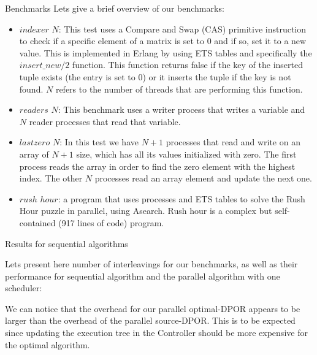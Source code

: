 \begin{frame} {Benchmarks}
Lets give a brief overview of our benchmarks:

\begin{itemize}
    \item $indexer$ $N$: This test uses a Compare and Swap (CAS) primitive instruction to check if a specific element of
    a matrix is set to 0 and if so, set it to a new value. This is implemented in Erlang by using ETS tables and specifically
    the $insert\_new/2$ function. This function returns false if the key of the inserted tuple exists (the entry is set to 0)
    or it inserts the tuple if the key is not found. $N$ refers to the number of threads that are performing this function.
    \item $readers$ $N$: This benchmark uses a writer process that writes a variable and $N$ reader processes that read that variable.
    \item $lastzero$ $N$: In this test we have $N+1$ processes that read and write on an array of $N+1$ size, which has all its 
    values initialized with zero. The first process reads the array in order to find the zero element with the highest
    index. The other $N$ processes read an array element and update the next one.
    \item $rush$ $hour$: a program that uses processes and
    ETS tables to solve the Rush Hour puzzle in parallel, using A\textasteriskcentered  search. Rush hour is a complex but self-contained (917 lines of code) program.
\end{itemize}

\end{frame}

\begin{frame}{Results for sequential algorithms}

Lets present here number of interleavings for our benchmarks, as well as their performance for sequential algorithm and the parallel algorithm with one scheduler:


We can notice that the overhead for our parallel optimal-DPOR appears to be larger than the overhead of the parallel source-DPOR.
This is to be expected since updating the execution tree in the Controller should be more expensive for the optimal algorithm.


\end{frame}

